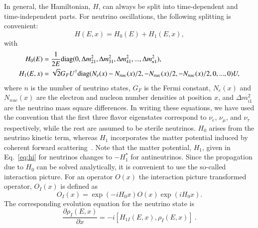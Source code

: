 \documentclass[3p,12pt]{elsarticle}
\newcommand{\pa}[2]{\frac{\partial #1}{\partial #2}}
\begin{document}
In general, the Hamiltonian, $H$, can always be split into
time-dependent and time-independent parts. For neutrino oscillations,
the following splitting is convenient:
\begin{equation}
H(E,x) = H_0(E)  + H_{1}(E,x) ,
\end{equation}
with
\begin{subequations}
\label{eq:hamiltonian}
\begin{align}
H_0 (E) &= \frac{1}{2E} {\rm diag}( 0 , \Delta m^2_{21},\Delta m^2_{31},\Delta m^2_{41},...,\Delta m^2_{n1}) \label{eq:h0} ,\\
H_1 (E,x) &= \sqrt{2} G_F U^\dagger {\rm diag} ( N_e(x) -
N_{nuc}(x)/2, -N_{nuc}(x)/2, -N_{nuc}(x)/2 , 0,...,0 )U ,\label{eq:hi} 
\end{align}
\end{subequations}
where $n$ is the number of neutrino states, $G_F$ is the Fermi
constant, $N_e(x)$ and $N_{nuc}(x)$ are the electron and nucleon number
densities at position $x$, and $\Delta m^2_{i1}$ are the neutrino mass
square differences.
In writing these equations, we have used the convention that the first
three flavor eigenstates correspond to 
$\nu_e$, $\nu_\mu$, and $\nu_\tau$ respectively, while the rest are assumed to be
sterile neutrinos. $H_0$ arises from the neutrino kinetic
term, whereas $H_1$ incorporates the matter potential induced by coherent
forward scattering~\citep{Mikheev:1986gs,Mikheev:1986wj,Wolfenstein:1977ue}. Note that the matter
potential, $H_1$, given in Eq.~\eqref{eq:hi} for neutrinos changes to
$-H_1^*$ for antineutrinos. 
Since the propagation due to $H_0$ can be solved analytically, it is
convenient to use the  so-called interaction picture. For an operator
$O(x)$ the interaction picture transformed
operator, $O_I(x)$ is defined as
\begin{equation}
O_I(x)=\exp(-iH_0x)O(x)\exp(iH_0x).
\end{equation}
The corresponding evolution equation  for the neutrino state is
\begin{equation}
\pa{\rho_I(E,x)}{x} = -i [ H_{1I} (E,x), \rho_I(E,x) ]~.
\label{eq:schrodinger_int}
\end{equation}
\end{document}
